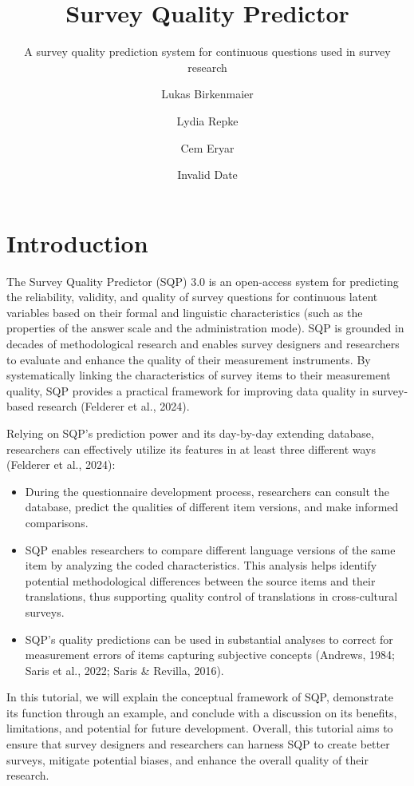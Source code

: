 \documentclass[
  letterpaper,
  DIV=11,
  numbers=noendperiod]{scrartcl}
\title{Survey Quality Predictor}
\subtitle{A survey quality prediction system for continuous questions
used in survey research}
\author{Lukas Birkenmaier \and Lydia Repke \and Cem Eryar}
\date{Invalid Date}
\begin{document}
\maketitle


\section{Introduction}\label{introduction}

The Survey Quality Predictor (SQP) 3.0 is an open-access system for
predicting the reliability, validity, and quality of survey questions
for continuous latent variables based on their formal and linguistic
characteristics (such as the properties of the answer scale and the
administration mode). SQP is grounded in decades of methodological
research and enables survey designers and researchers to evaluate and
enhance the quality of their measurement instruments. By systematically
linking the characteristics of survey items to their measurement
quality, SQP provides a practical framework for improving data quality
in survey-based research (Felderer et al., 2024).

Relying on SQP's prediction power and its day-by-day extending database,
researchers can effectively utilize its features in at least three
different ways (Felderer et al., 2024):

\begin{itemize}
\item
  During the questionnaire development process, researchers can consult
  the database, predict the qualities of different item versions, and
  make informed comparisons.
\item
  SQP enables researchers to compare different language versions of the
  same item by analyzing the coded characteristics. This analysis helps
  identify potential methodological differences between the source items
  and their translations, thus supporting quality control of
  translations in cross-cultural surveys.
\item
  SQP's quality predictions can be used in substantial analyses to
  correct for measurement errors of items capturing subjective concepts
  (Andrews, 1984; Saris et al., 2022; Saris \& Revilla, 2016).
\end{itemize}

In this tutorial, we will explain the conceptual framework of SQP,
demonstrate its function through an example, and conclude with a
discussion on its benefits, limitations, and potential for future
development. Overall, this tutorial aims to ensure that survey designers
and researchers can harness SQP to create better surveys, mitigate
potential biases, and enhance the overall quality of their research.
\end{document}
